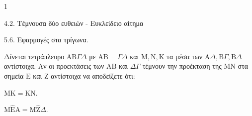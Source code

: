 \begin{ylh}{1}
    \item 4.2. Τέμνουσα δύο ευθειών - Ευκλείδειο αίτημα
    \item 5.6. Εφαρμογές στα τρίγωνα.
\end{ylh}
Δίνεται τετράπλευρο $\mathrm{A}\mathrm{B}\Gamma\Delta$ με $\mathrm{A}\mathrm{B} = \Gamma\Delta$ και $\mathrm{M}, \mathrm{N}, \mathrm{K}$ τα μέσα των $\mathrm{A}\Delta, \mathrm{B}\Gamma, \mathrm{B}\Delta$ αντίστοιχα. Αν οι προεκτάσεις των $\mathrm{A}\mathrm{B}$ και $\Delta\Gamma$ τέμνουν την προέκταση της $\mathrm{M}\mathrm{N}$ στα σημεία $\mathrm{E}$ και $\mathrm{Z}$ αντίστοιχα να αποδείξετε ότι:
\begin{alist}
    \item $\mathrm{M}\mathrm{K} = \mathrm{K}\mathrm{N}$. 
    \item $\mathrm{M}\hat{\mathrm{E}}\mathrm{A} = \mathrm{M}\hat{\mathrm{Z}}\Delta$. 
\end{alist}
